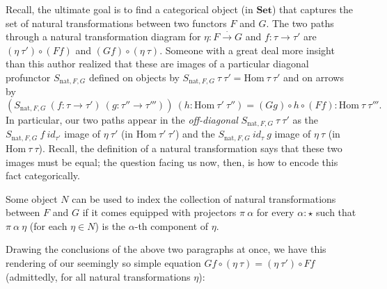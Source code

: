 \documentclass[letterpaper]{article}
\begin{document}
Recall, the ultimate goal is to find a categorical object (in
$\mathbf{Set}$) that captures the set of natural transformations between two
functors $F$ and $G$.  The two paths through a natural transformation
diagram for $\eta : F \stackrel{\cdot}{\to} G$ and $f : \tau \to \tau'$ are
$(\eta~\tau') \circ (F f)$ and $(G f) \circ (\eta~\tau)$.  Someone with a
great deal more insight than this author realized that these are images of a
particular diagonal profunctor $S_{\text{nat},F,G}$ defined on objects by
$S_{\text{nat},F,G}~\tau~\tau' = \text{Hom}~\tau~\tau'$ and on arrows by
%
\[ (S_{\text{nat},F,G}~(f : \tau \to \tau')~(g : \tau'' \to \tau'''))~(h :
\text{Hom}~\tau'~\tau'') = (G g) \circ h \circ (F f) :
\text{Hom}~\tau~\tau'''.\]
%
In particular, our two paths appear in the {\em off-diagonal}
$S_{\text{nat},F,G}~\tau~\tau'$ as the $S_{\text{nat},F,G}~f~id_{\tau'}$
image of $\eta~\tau'$ (in $\text{Hom}~\tau'~\tau'$) and the
$S_{\text{nat},F,G}~id_{\tau}~g$ image of $\eta~\tau$ (in
$\text{Hom}~\tau~\tau$).  Recall, the definition of a natural transformation
says that these two images must be equal; the question facing us now, then,
is how to encode this fact categorically.

Some object $N$ can be used to index the collection of natural
transformations between $F$ and $G$ if it comes equipped with projectors
$\pi~\alpha$ for every $\alpha : \star$ such that $\pi~\alpha~\eta$ (for
each $\eta \in N$) is the $\alpha$-th component of $\eta$.

Drawing the conclusions of the above two paragraphs at once, we have this
rendering of our seemingly so simple equation $G f \circ (\eta~\tau) =
(\eta~\tau') \circ F f$ (admittedly, for all natural transformations
$\eta$):
%
\begin{center}\end{center}
\end{document}
